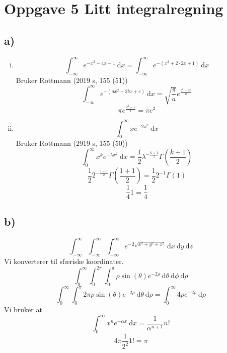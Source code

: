 \documentclass{article}
\begin{document}
\section*{Oppgave 5 Litt integralregning}
\subsection*{a)}
\begin{enumerate}[(i)]
    \item 
    \[
    ∫_{-∞}^{∞} e^{-x^{2} - 4x - 1} \ \mathrm{d}x = ∫_{-∞}^{∞} e^{-\left( x^{2} + 2 ⋅ 2x + 1 \right) } \ \mathrm{d}x
    \]
    Bruker Rottmann (2019 s, 155 (51))
    \[
    ∫_{-∞}^{∞} e^{-\left( ax^{2} + 2bx + c \right) } \ \mathrm{d}x = \sqrt{\frac{π}{a}} e^{\frac{b^{2} - ac}{a}}
    \]
    \[
    π e^{\frac{2^{2} - 1}{1}} = π e^{3}
    \] 
    \item   
    \[
    ∫_{0}^{∞} xe ^{-2x^{2}} \ \mathrm{d}x
    \]
    Bruker Rottmann (2919 s, 155 (50))
    \[
    ∫_{0}^{∞} x^{k} e^{- λx^{2}} \ \mathrm{d}x = \frac{1}{2} λ ^{-\frac{k + 1}{2}} Γ \left( \frac{k + 1}{2} \right) 
    \]
    \[
    \frac{1}{2}2^{- \frac{1 + 1}{2}} Γ\left( \frac{1+1}{2} \right) = \frac{1}{2} 2^{-1} Γ(1)
    \]
    \[
    \frac{1}{4} 1 = \frac{1}{4}
    \]
\end{enumerate}
\subsection*{b)}
\[
∫_{-∞}^{∞} ∫_{-∞}^{∞} ∫_{-∞}^{∞} e^{-2 \sqrt{x^2 + y^2 + z^2 }} \ \mathrm{d}x \ \mathrm{d}y \ \mathrm{d}z
\]
Vi konverterer til sfæriske koordinater. 
\[
∫_{0}^{∞} ∫_{0}^{2π} ∫_{0}^{π} ρ \sin (θ) e^{-2ρ}  \ \mathrm{d}θ \ \mathrm{d}ϕ \ \mathrm{d}ρ
\]
\[
∫_{0}^{∞} ∫_{0}^{π} 2π ρ \sin (θ) e^{-2ρ} \ \mathrm{d}θ \ \mathrm{d}ρ = ∫_{0}^{∞} 4 ρ e^{-2ρ} \ \mathrm{d}ρ
\]
Vi bruker at 
\[
∫_{0}^{∞} x^{n} e ^{-α x} \ \mathrm{d}x = \frac{1}{α^{n+1}}n!
\]
\[
4π \frac{1}{2^{2}} 1! = π
\]
\end{document}
